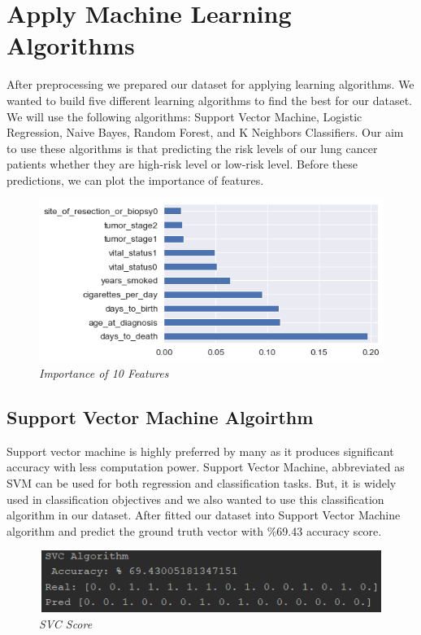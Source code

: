 \documentclass[onecolumn]{article}
\begin{document}
\section{Apply Machine Learning Algorithms}
After preprocessing we prepared our dataset for applying learning algorithms. We wanted to build five different learning algorithms to find the best for our dataset. We will use the following algorithms: Support Vector Machine, Logistic Regression, Naive Bayes, Random Forest, and K Neighbors Classifiers. Our aim to use these algorithms is that predicting the risk levels of our lung cancer patients whether they are high-risk level or low-risk level. Before these predictions, we can plot the importance of features.
\begin{figure}[h]
\includegraphics[scale=0.7]{importancee.png}
\caption{\emph{Importance of 10 Features}}
\centering
\end{figure}
\subsection{Support Vector Machine Algoirthm}
Support vector machine is highly preferred by many as it produces significant accuracy with less computation power. Support Vector Machine, abbreviated as SVM can be used for both regression and classification tasks. But, it is widely used in classification objectives and we also wanted to use this classification algorithm in our dataset. After fitted our dataset into Support Vector Machine algorithm and predict the ground truth vector with \%69.43 accuracy score.
\begin{figure}[h]
\includegraphics[width=15cm, height=2cm]{SVC_score.png}
\caption{\emph{SVC Score}}
\centering
\end{figure}
\end{document}
